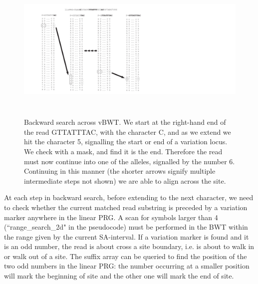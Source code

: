 \documentclass[runningheads,a4paper]{llncs}
\begin{document}
\begin{figure}
\centering
\includegraphics[height=7cm]{BWT.pdf}
\caption{Backward search across vBWT.  We start at the right-hand end of the read GTTATTTAC, with the character C, and as we extend we hit the character 5, signalling the start or end of a variation locus. We check with a mask, and find it is the end. Therefore the read must now continue into one of the alleles, signalled by the number 6. Continuing in this manner (the shorter arrows signify multiple intermediate steps not shown) we are able to align across the site.}
\label{fig:example}
\end{figure}

At each step in backward search, before extending to the next character, we need to check whether the current matched read substring is preceded by a variation marker anywhere in the linear PRG. A scan for symbols larger than 4 (``range\_search\_2d" in the pseudocode) must be performed in the BWT within the range given by the current SA-interval. If a variation marker is found and it is an odd number, the read is about cross a site boundary, i.e. is about to walk in or walk out of a site. The suffix array can be queried to find the position of the two odd numbers in the linear PRG: the number occurring at a smaller position will mark the beginning of site and the other one will mark the end of site.  
\end{document}
